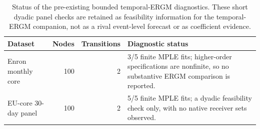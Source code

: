 \begin{table}[H]
\centering
\caption{Status of the pre-existing bounded temporal-ERGM diagnostics. These short dyadic panel checks are retained as feasibility information for the temporal-ERGM companion, not as a rival event-level forecast or as coefficient evidence.}
\label{tab:btergm-boundary}
\small
\begin{tabular}{p{}rrp{}}
\toprule
Dataset & Nodes & Transitions & Diagnostic status \\
\midrule
Enron monthly core & 100 & 2 & 3/5 finite MPLE fits; higher-order specifications are nonfinite, so no substantive ERGM comparison is reported. \\
EU-core 30-day panel & 100 & 2 & 5/5 finite MPLE fits; a dyadic feasibility check only, with no native receiver sets observed. \\
\bottomrule
\end{tabular}
\end{table}
